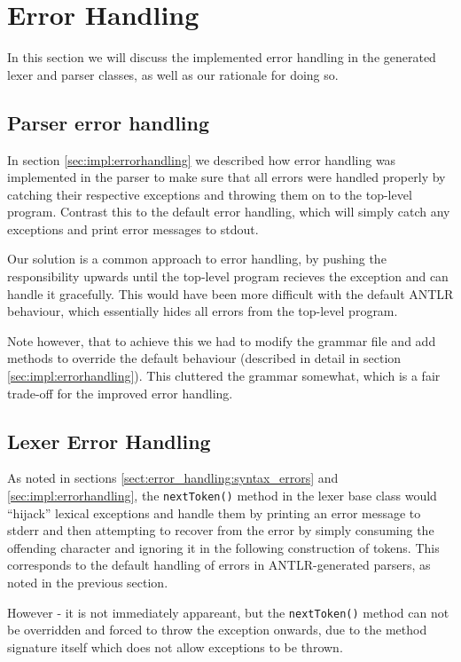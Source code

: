 \section{Error Handling}
In this section we will discuss the implemented error handling in the generated
lexer and parser classes, as well as our rationale for doing so. 

\subsection{Parser error handling}
In section \ref{sec:impl:errorhandling} we described how error handling was
implemented in the parser to make sure that all errors were handled properly by
catching their respective exceptions and throwing them on to the top-level
program. Contrast this to the default error handling, which will simply catch
any exceptions and print error messages to stdout.

Our solution is a common approach to error handling, by pushing the
responsibility upwards until the top-level program recieves the exception and
can handle it gracefully. This would have been more difficult with the default
ANTLR behaviour, which essentially hides all errors from the top-level program.

Note however, that to achieve this we had to modify the grammar file and add
methods to override the default behaviour (described in detail in section
\ref{sec:impl:errorhandling}). This cluttered the grammar somewhat, which is a
fair trade-off for the improved error handling.

\subsection{Lexer Error Handling}
\label{sect:future_work:lexer_error_handling} %
As noted in sections \ref{sect:error_handling:syntax_errors} and
\ref{sec:impl:errorhandling}, the \verb!nextToken()! method in the lexer base class
would ``hijack'' lexical exceptions and handle them by printing an error message
to stderr and then attempting to recover from the error by simply consuming the
offending character and ignoring it in the following construction of tokens.
This corresponds to the default handling of errors in ANTLR-generated parsers,
as noted in the previous section.

However - it is not immediately appareant, but the \verb!nextToken()! method can
not be overridden and forced to throw the exception onwards, due to the method
signature itself which does not allow exceptions to be thrown. 

